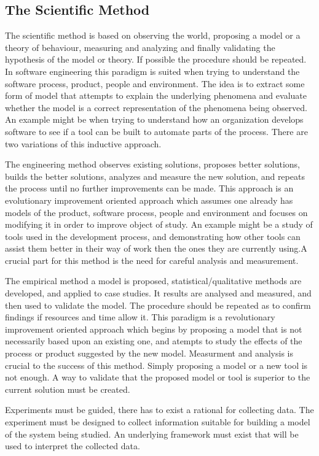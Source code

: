\subsection{The Scientific Method}
The scientific method is based on observing the world, proposing a model or a theory of behaviour, measuring and analyzing and finally validating the hypothesis of the model or theory. If possible the procedure should be repeated. In software engineering this paradigm is suited when trying to understand the software process, product, people and environment. The idea is to extract some form of model that attempts to explain the underlying phenomena and evaluate whether the model is a correct representation of the phenomena being observed. An example might be when trying to understand how an organization develops software to see if a tool can be built to automate parts of the process. There are two variations of this inductive approach.

The engineering method observes existing solutions, proposes better solutions, builds the better solutions, analyzes and measure the new solution, and repeats the process until no further improvements can be made. This approach is an evolutionary improvement oriented approach which assumes one already has models of the product, software process, people and environment and focuses on modifying it in order to improve object of study. An example might be a study of tools used in the development process, and demonstrating how other tools can assist them better in their way of work then the ones they are currently using.A crucial part for this method is the need for careful analysis and measurement.

The empirical method a model is proposed, statistical/qualitative methods are developed, and applied to case studies. It results are analysed and measured, and then used to validate the model. The procedure should be repeated as to confirm findings if resources and time allow it. This paradigm is a revolutionary improvement oriented approach which begins by proposing a model that is not necessarily based upon an existing one, and atempts to study the effects of the process or product suggested by the new model. Measurment and analysis is crucial to the success of this method. Simply proposing a model or a new tool is not enough. A way to validate that the proposed model or tool is superior to the current solution must be created.

Experiments must be guided, there has to exist a rational for collecting data. The experiment must be designed to collect information suitable for building a model of the system being studied. An underlying framework must exist that will be used to interpret the collected data.

